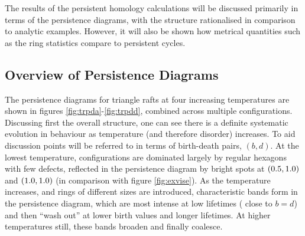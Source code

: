 The results of the persistent homology calculations will be discussed primarily in terms of the persistence diagrams, with the structure rationalised in comparison to analytic examples. 
However, it will also be shown how metrical quantities such as the ring statistics compare to persistent cycles.

\subsection{Overview of Persistence Diagrams}

The persistence diagrams for triangle rafts at four increasing temperatures are shown in figures \ref{fig:trpda}\--\ref{fig:trpdd}, combined across multiple configurations.
Discussing first the overall structure, one can see there is a definite systematic evolution in behaviour as temperature (and therefore disorder) increases.
To aid discussion points will be referred to in terms of birth\--death pairs, $\left(b,d\right)$.
At the lowest temperature, configurations are dominated largely by regular hexagons with few defects, reflected in the persistence diagram by bright spots at $\left(0.5,1.0\right)$ and $\left(1.0,1.0\right)$ (in comparison with figure \ref{fig:exvise}).
As the temperature increases, and rings of different sizes are introduced, characteristic bands form in the persistence diagram, which are most intense at low lifetimes (\ie{} close to $b=d$) and then ``wash out'' at lower birth values and longer lifetimes. 
At higher temperatures still, these bands broaden and finally coalesce.

